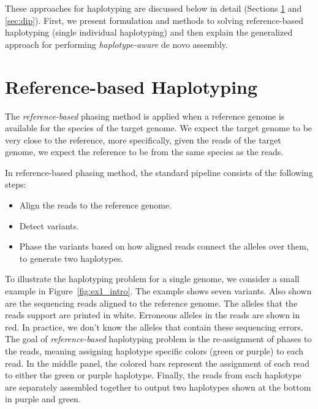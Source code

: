 These approaches for haplotyping are discussed below in detail (Sections \ref{sec:ref} and \ref{sec:dip}). 
First, we present formulation and methods to solving reference-based haplotyping (single individual haplotyping) and then explain the generalized approach for performing \textit{haplotype-aware} de novo assembly.
\section{Reference-based Haplotyping}\label{sec:ref}
The \textit{reference-based} phasing method is applied when a reference genome is available for the species of the target genome.
We expect the target genome to be very close to the reference, more specifically, given the reads of the target genome, we expect the reference to be from the same species as the reads.

In reference-based phasing method, the standard pipeline consists of the following steps: 
\begin{itemize}
 \item Align the reads to the reference genome.
 \item Detect variants.
 \item Phase the variants based on how aligned reads connect the alleles over them, to generate two haplotypes.
\end{itemize}

\begin{example}
 To illustrate the haplotyping problem for a single genome, we consider a small example in Figure~\ref{fig:ex1_intro}. The example shows seven variants. Also shown are the sequencing reads aligned to the reference genome.
 The alleles that the reads support are printed in white. 
 Erroneous alleles in the reads are shown in red. In practice, we don't know the alleles that contain these sequencing errors. 
 The goal of \textit{reference-based} haplotyping problem is the re-assignment of phases to the reads, meaning assigning haplotype specific colors (green or purple) to each read. 
 In the middle panel, the colored bars represent the assignment of each read to either the green or purple haplotype.
 Finally, the reads from each haplotype are separately assembled together to output two haplotypes shown at the bottom in purple and green.
\end{example}

